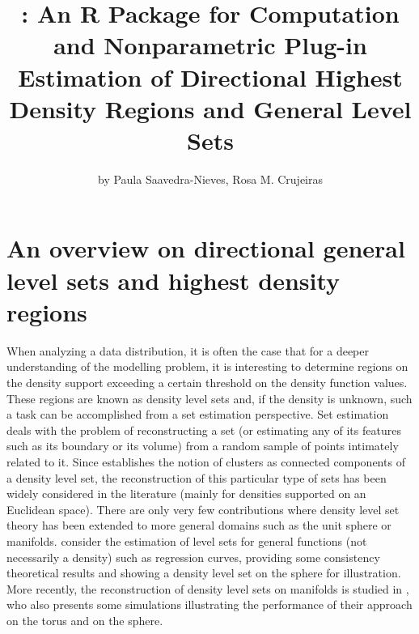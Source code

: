 \title{: An R Package for Computation and Nonparametric Plug-in Estimation of Directional Highest Density Regions and General Level Sets}
\author{by Paula Saavedra-Nieves, Rosa M. Crujeiras}

\maketitle

 




\section{An overview on directional general level sets and highest density regions}
When analyzing a data distribution, it is often the case that for a deeper understanding of the modelling problem, it is interesting to determine regions on the density support exceeding a certain threshold on the density function values. These regions are known as density level sets and, if the density is unknown, such a task can be accomplished from a set estimation perspective. Set estimation deals with the problem of reconstructing a set (or estimating any of its features such as its boundary or its volume) from a random sample of points intimately related to it. Since \cite{hartigan1975clustering} establishes the notion of clusters as connected components of a density level set, the reconstruction of this particular type of  sets has been widely considered in the literature (mainly for densities supported on an Euclidean space). There are only very few contributions where density level set theory has been extended to more general domains such as the unit sphere or manifolds. \cite{cuevas2006plug} consider the estimation of level sets for general functions (not necessarily a density) such as regression curves, providing some consistency theoretical results and showing a density level set on the sphere for illustration. More recently, the reconstruction of density level sets on manifolds is studied in \cite{cholaquidis2020level}, who also presents some simulations illustrating the performance of their approach on the torus and on the sphere. 


